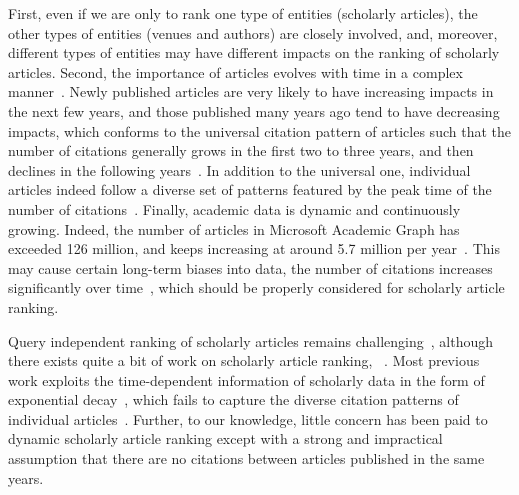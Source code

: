 First, even if we are only to rank one type of entities (\ie scholarly articles), the other types of entities (\eg venues and authors) are closely involved, and, moreover, different types of entities may have different impacts on the ranking of scholarly articles.
%
Second, the importance of articles evolves with time in a complex manner~\cite{WangSB13,Chakraborty15}.
Newly published articles are very likely to have increasing impacts in the next few years, and those published many years ago tend to have decreasing impacts, which conforms to the universal citation pattern of articles such that the number of citations generally grows in the first two to three years, and then declines in the following years~\cite{Chakraborty15}. In addition to the universal one, individual articles indeed follow a diverse set of patterns featured by the peak time of the number of citations~\cite{Chakraborty15}.
Finally, academic data is dynamic and continuously growing. Indeed, the number of articles in Microsoft Academic Graph has exceeded 126 million, and keeps increasing at around 5.7 million per year~\cite{Sinha15:MAG}. This may cause certain long-term biases into data, \eg the number of citations increases significantly over time~\cite{BornmannM15}, which should be properly considered for scholarly article ranking.


Query independent ranking of scholarly articles remains challenging~\cite{wsdmcup}, although there exists quite a bit of work on scholarly article ranking, \eg~\cite{Garfield471,Liang16AAAI,Jiang12-MRank,Waltman2014}.
Most previous work exploits the time-dependent information of scholarly data in the form of exponential decay~\cite{Li08TSRanking,Wang13AAAI,sayyadi09,WalkerXKM07}, which fails to capture the diverse citation patterns of individual articles~\cite{Chakraborty15}.
Further, to our knowledge, little concern has been paid to dynamic scholarly article ranking except \cite{GhoshKHLL11} with a strong and impractical assumption that there are no citations between articles published in the same years.




